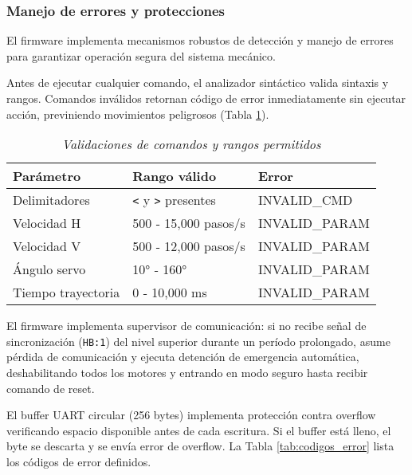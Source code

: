 \subsubsection{Manejo de errores y protecciones}

El firmware implementa mecanismos robustos de detección y manejo de errores para garantizar operación segura del sistema mecánico.

Antes de ejecutar cualquier comando, el analizador sintáctico valida sintaxis y rangos. Comandos inválidos retornan código de error inmediatamente sin ejecutar acción, previniendo movimientos peligrosos (Tabla \ref{tab:validacion_comandos}).

\begin{table}[H]
\centering
\small
\begin{tabular}{|l|l|l|}
\hline
Parámetro & Rango válido & Error \\
\hline
Delimitadores & \texttt{<} y \texttt{>} presentes & INVALID\_CMD \\
\hline
Velocidad H & 500 - 15,000 pasos/s & INVALID\_PARAM \\
\hline
Velocidad V & 500 - 12,000 pasos/s & INVALID\_PARAM \\
\hline
Ángulo servo & 10° - 160° & INVALID\_PARAM \\
\hline
Tiempo trayectoria & 0 - 10,000 ms & INVALID\_PARAM \\
\hline
\end{tabular}
\caption{\textit{Validaciones de comandos y rangos permitidos}}
\label{tab:validacion_comandos}
\end{table}

El firmware implementa supervisor de comunicación: si no recibe señal de sincronización (\texttt{HB:1}) del nivel superior durante un período prolongado, asume pérdida de comunicación y ejecuta detención de emergencia automática, deshabilitando todos los motores y entrando en modo seguro hasta recibir comando de reset.

El buffer UART circular (256 bytes) implementa protección contra overflow verificando espacio disponible antes de cada escritura. Si el buffer está lleno, el byte se descarta y se envía error de overflow. La Tabla \ref{tab:codigos_error} lista los códigos de error definidos.

